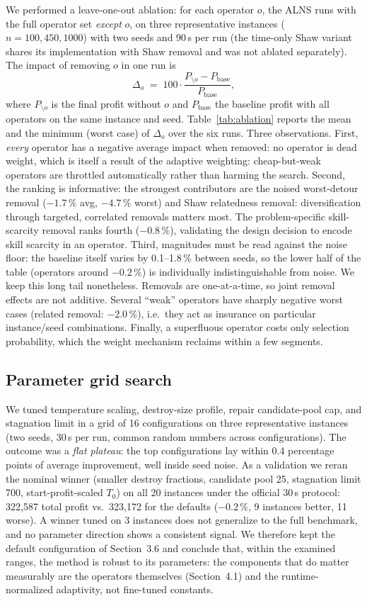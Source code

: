 \documentclass[10pt, a4paper]{article}
\begin{document}
We performed a leave-one-out ablation: for each operator $o$, the ALNS runs
with the full operator set \emph{except} $o$, on three representative
instances ($n=100, 450, 1000$) with two seeds and 90\,s per run (the
time-only Shaw variant shares its implementation with Shaw removal and was
not ablated separately). The impact of removing $o$ in one run is
\[
\Delta_o \;=\; 100 \cdot
\frac{P_{\setminus o} - P_{\text{base}}}{P_{\text{base}}},
\]
where $P_{\setminus o}$ is the final profit without $o$ and
$P_{\text{base}}$ the baseline profit with all operators on the same
instance and seed. Table~\ref{tab:ablation} reports the mean and the
minimum (worst case) of $\Delta_o$ over the six runs. Three observations. First, \emph{every} operator has a
negative average impact when removed: no operator is dead weight, which is
itself a result of the adaptive weighting: cheap-but-weak operators are
throttled automatically rather than harming the search. Second, the ranking
is informative: the strongest contributors are the noised worst-detour
removal ($-1.7\,\%$ avg, $-4.7\,\%$ worst) and Shaw relatedness
removal: diversification through targeted, correlated removals matters most.
The problem-specific skill-scarcity removal ranks fourth ($-0.8\,\%$),
validating the design decision to encode skill scarcity in an operator.
Third, magnitudes must be read against the noise floor: the baseline itself
varies by 0.1--1.8\,\% between seeds, so the lower half of the table
(operators around $-0.2\,\%$) is individually indistinguishable from noise.
We keep this long tail nonetheless. Removals are one-at-a-time, so joint
removal effects are not additive. Several ``weak'' operators have sharply
negative worst cases (related removal: $-2.0\,\%$), i.e.\ they act as
insurance on particular instance/seed combinations. Finally, a superfluous
operator costs only selection probability, which the weight mechanism
reclaims within a few segments.

\subsection{Parameter grid search}

We tuned temperature scaling, destroy-size profile, repair candidate-pool
cap, and stagnation limit in a grid of 16 configurations on three
representative instances (two seeds, 30\,s per run, common random numbers
across configurations). The outcome was a \emph{flat plateau}: the top
configurations lay within 0.4 percentage points of average improvement, well
inside seed noise. As a validation we reran the nominal winner (smaller
destroy fractions, candidate pool 25, stagnation limit 700, start-profit-scaled
$T_0$) on all 20 instances under the official 30\,s protocol: 322{,}587
total profit vs.\ 323{,}172 for the defaults ($-0.2\,\%$, 9 instances better,
11 worse). A winner tuned on 3 instances does not generalize to the full
benchmark, and no parameter direction shows a consistent signal. We therefore
kept the default configuration of Section~3.6 and conclude that, within the
examined ranges, the method is robust to its parameters: the components that
do matter measurably are the operators themselves (Section~4.1) and the
runtime-normalized adaptivity, not fine-tuned constants.
\end{document}
